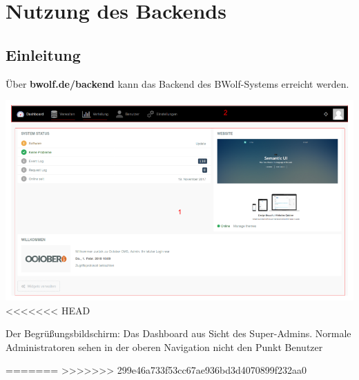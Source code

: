 \chapter{Nutzung des Backends}
\label{chapter:use}
  
  \section{Einleitung}
  \label{section:backend_introduction}
  
  Über \textbf{bwolf.de/backend} kann das Backend des BWolf-Systems erreicht werden.
  
  \includegraphics[scale=0.3]{backend/img/dashboard.png}
<<<<<<< HEAD
  \caption{\newline Der Begrüßungsbildschirm: Das Dashboard aus Sicht des Super-Admins.\newline
	  Normale Administratoren sehen in der oberen Navigation nicht den Punkt Benutzer}
=======
>>>>>>> 299e46a733f53cc67ae936bd3d4070899f232aa0
